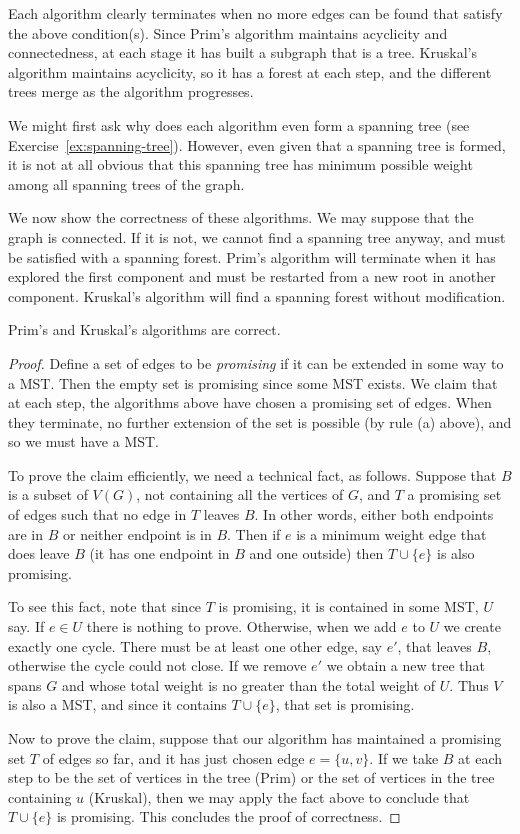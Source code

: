 Each algorithm clearly terminates when no more edges can be found
that satisfy the above condition(s). Since Prim's algorithm maintains
acyclicity and connectedness, at each stage it has built a subgraph that
is a tree. Kruskal's algorithm maintains acyclicity, so it has a forest
at each step, and the different trees merge as the algorithm progresses.

We might first ask why does each algorithm even form a spanning tree (see
Exercise~\ref{ex:spanning-tree}). However, even given that a spanning
tree is formed, it is not at all obvious that this spanning tree has
minimum possible weight among all spanning trees of the graph.

We now show the correctness of these algorithms. We may suppose that the
graph is connected. If it is not, we cannot find a spanning tree anyway,
and must be satisfied with a spanning forest. Prim's algorithm will
terminate when it has explored the first component and must be
restarted from a new root in another component. Kruskal's algorithm
will find a spanning forest without modification.

\begin{Theorem}
\label{thm:prim-kruskal}
Prim's and Kruskal's algorithms are correct.
\end{Theorem}

\begin{proof}
Define a set of edges to be \emph{promising} if it can be
extended in some way to a MST. Then the empty set is promising since
some MST exists. We claim that at each step, the algorithms above have
chosen a promising set of edges. When they terminate, no further
extension of the set  is possible (by rule (a) above), and so we must
have a MST.

To prove the claim efficiently, we need a technical fact, as follows.
Suppose that $B$ is a subset of $V(G)$, not containing all the vertices
of $G$, and $T$ a promising set of edges such that no edge in $T$ leaves
$B$. In other words, either both endpoints are in $B$ or neither
endpoint is in $B$. Then if $e$ is a minimum weight edge that does leave
$B$ (it has one endpoint in $B$ and one outside) then $T\cup\{e\}$ is
also promising.

To see this fact, note that since $T$ is promising, it is contained in
some MST, $U$ say. If $e\in U$ there is nothing to prove. Otherwise,
when we add $e$ to $U$ we create exactly one cycle. There must be at
least one other edge, say $e'$, that leaves $B$, otherwise the cycle
could not close. If we remove $e'$ we obtain a new tree that spans $G$
and whose total weight is no greater than the total weight of $U$. Thus
$V$ is also a MST, and since it contains $T\cup\{e\}$, that set is
promising.

Now to prove the claim, suppose that our algorithm has maintained a
promising set $T$ of edges so far, and it has just chosen edge $e=\{u,v\}$.
If we take $B$ at each step to be the set of vertices in the tree (Prim)
or the set of vertices in the tree containing $u$ (Kruskal), then we may
apply the fact above to conclude that $T \cup \{e\}$ is promising. This
concludes the proof of correctness.
\end{proof}

